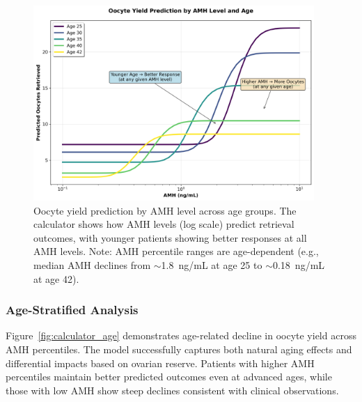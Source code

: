 \begin{figure}[H]
    \centering
    \includegraphics[width=0.95\textwidth]{figures/calculator_amh_oocytes.png}
    \caption{Oocyte yield prediction by AMH level across age groups. The calculator shows how AMH levels (log scale) predict retrieval outcomes, with younger patients showing better responses at all AMH levels. Note: AMH percentile ranges are age-dependent (e.g., median AMH declines from $\sim$1.8~ng/mL at age 25 to $\sim$0.18~ng/mL at age 42).}
    \label{fig:calculator_amh}
\end{figure}

\subsubsection{Age-Stratified Analysis}

Figure~\ref{fig:calculator_age} demonstrates age-related decline in oocyte yield across AMH percentiles. The model successfully captures both natural aging effects and differential impacts based on ovarian reserve. Patients with higher AMH percentiles maintain better predicted outcomes even at advanced ages, while those with low AMH show steep declines consistent with clinical observations.


